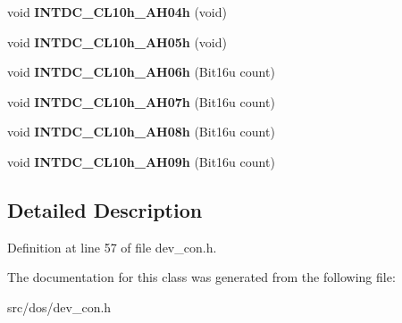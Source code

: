 \begin{DoxyCompactItemize}
\item 
\hypertarget{classdevice__CON_a78473f2b01e9d884a462f3af0176677e}{void {\bfseries I\-N\-T\-D\-C\-\_\-\-C\-L10h\-\_\-\-A\-H04h} (void)}\label{classdevice__CON_a78473f2b01e9d884a462f3af0176677e}

\item 
\hypertarget{classdevice__CON_ab90d2371a9bc21b52843a5caf806318c}{void {\bfseries I\-N\-T\-D\-C\-\_\-\-C\-L10h\-\_\-\-A\-H05h} (void)}\label{classdevice__CON_ab90d2371a9bc21b52843a5caf806318c}

\item 
\hypertarget{classdevice__CON_a5617af033e544f08d5e890d87de00863}{void {\bfseries I\-N\-T\-D\-C\-\_\-\-C\-L10h\-\_\-\-A\-H06h} (Bit16u count)}\label{classdevice__CON_a5617af033e544f08d5e890d87de00863}

\item 
\hypertarget{classdevice__CON_a2e7c061e9163d43cbc4fe5f3856f721d}{void {\bfseries I\-N\-T\-D\-C\-\_\-\-C\-L10h\-\_\-\-A\-H07h} (Bit16u count)}\label{classdevice__CON_a2e7c061e9163d43cbc4fe5f3856f721d}

\item 
\hypertarget{classdevice__CON_a51ca1e968122673e3aad1d30677fa804}{void {\bfseries I\-N\-T\-D\-C\-\_\-\-C\-L10h\-\_\-\-A\-H08h} (Bit16u count)}\label{classdevice__CON_a51ca1e968122673e3aad1d30677fa804}

\item 
\hypertarget{classdevice__CON_aa21a9ea8d643ca136843a09c9429a07f}{void {\bfseries I\-N\-T\-D\-C\-\_\-\-C\-L10h\-\_\-\-A\-H09h} (Bit16u count)}\label{classdevice__CON_aa21a9ea8d643ca136843a09c9429a07f}

\end{DoxyCompactItemize}


\subsection{Detailed Description}


Definition at line 57 of file dev\-\_\-con.\-h.



The documentation for this class was generated from the following file\-:\begin{DoxyCompactItemize}
\item 
src/dos/dev\-\_\-con.\-h\end{DoxyCompactItemize}
